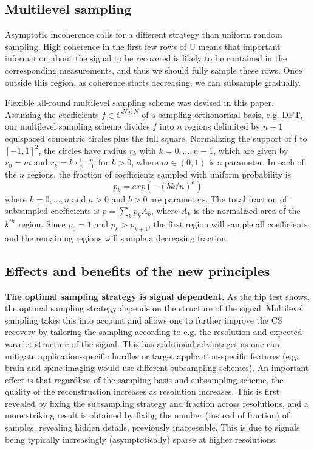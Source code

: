 \documentclass{article}
\begin{document}
\subsection{Multilevel sampling}
Asymptotic incoherence calls for a different strategy than uniform random sampling. High coherence in the first few rows of U means that important information about the signal to be recovered is likely to be contained in the corresponding measurements, and thus we should fully sample these rows. Once outside this region, as coherence starts decreasing, we can subsample gradually.

Flexible all-round multilevel sampling scheme was devised in this paper\cite{Roman2014OnSensing}. Assuming the coefficients $f \in C^{N \times N}$ of a sampling orthonormal basis, e.g. DFT, our multilevel sampling scheme divides $f$ into $n$ regions delimited by $n-1$ equispaced concentric circles plus the full square. Normalizing the support of f to $[-1,1]^2$, the circles have radius $r_k$
with $k = 0,... , n-1$, which are given by $r_0 = m$ and $r_k = k \cdot \frac{1-m}{n-1}$
for $k > 0$, where $m \in (0,1)$ is a parameter. In each of the $n$ regions,
the fraction of coefficients sampled with uniform probability is
$$p_k = exp(-(bk/n)^a)$$ 
where $k = 0, ... , n$ and $a > 0$ and $b > 0$ are parameters. The total fraction of subsampled coefficients is $p = \sum_{k}p_k A_k$, where $A_k$ is
the normalized area of the $k^{th}$ region. Since $p_0 = 1$ and $p_k > p_{k+1}$,
the first region will sample all coefficients and the remaining regions will sample a decreasing fraction.


\subsection{Effects and benefits of the new principles}
\textbf{ The optimal sampling strategy is signal dependent.} As the flip test shows, the optimal sampling strategy depends on the structure of  the signal. Multilevel sampling takes this into account and allows one  to further improve the CS recovery by tailoring the sampling according to e.g. the resolution and expected wavelet structure of the signal. This has additional advantages as one can mitigate application-specific hurdles or target application-specific features (e.g. brain and  spine imaging would use different subsampling schemes). An important effect is that regardless of the sampling basis and subsampling scheme, the quality of the reconstruction increases as resolution increases. This is first revealed by fixing the subsampling strategy and fraction across resolutions, and a more striking result is obtained by fixing the number (instead of fraction) of samples, revealing hidden details, previously inaccessible. This is due to signals being typically increasingly (asymptotically) sparse at higher resolutions. 
\end{document}
